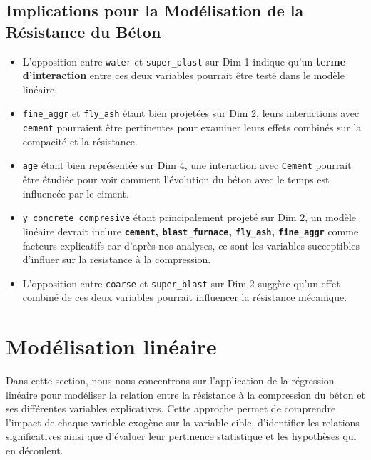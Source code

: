 \documentclass[
  12pt,
]{article}
\providecommand{\tightlist}{%
  \setlength{\itemsep}{0pt}\setlength{\parskip}{0pt}}
\begin{document}
\subsection{Implications pour la Modélisation de la Résistance du
Béton}\label{implications-pour-la-moduxe9lisation-de-la-ruxe9sistance-du-buxe9ton}

\begin{itemize}
\tightlist
\item
  L'opposition entre \texttt{water} et \texttt{super\_plast} sur Dim 1
  indique qu'un \textbf{terme d'interaction} entre ces deux variables
  pourrait être testé dans le modèle linéaire.
\item
  \texttt{fine\_aggr} et \texttt{fly\_ash} étant bien projetées sur Dim
  2, leurs interactions avec \texttt{cement} pourraient être pertinentes
  pour examiner leurs effets combinés sur la compacité et la résistance.
\item
  \texttt{age} étant bien représentée sur Dim 4, une interaction avec
  \texttt{Cement} pourrait être étudiée pour voir comment l'évolution du
  béton avec le temps est influencée par le ciment.
\item
  \texttt{y\_concrete\_compresive} étant principalement projeté sur Dim
  2, un modèle linéaire devrait inclure \textbf{\texttt{cement},
  \texttt{blast\_furnace}, \texttt{fly\_ash}, \texttt{fine\_aggr}} comme
  facteurs explicatifs car d'après nos analyses, ce sont les variables
  succeptibles d'influer sur la resistance à la compression.
\item
  L'opposition entre \texttt{coarse} et \texttt{super\_blast} sur Dim 2
  suggère qu'un effet combiné de ces deux variables pourrait influencer
  la résistance mécanique.
\end{itemize}

\newpage

\section{Modélisation linéaire}\label{moduxe9lisation-linuxe9aire}

Dans cette section, nous nous concentrons sur l'application de la
régression linéaire pour modéliser la relation entre la résistance à la
compression du béton et ses différentes variables explicatives. Cette
approche permet de comprendre l'impact de chaque variable exogène sur la
variable cible, d'identifier les relations significatives ainsi que
d'évaluer leur pertinence statistique et les hypothèses qui en
découlent.
\end{document}
